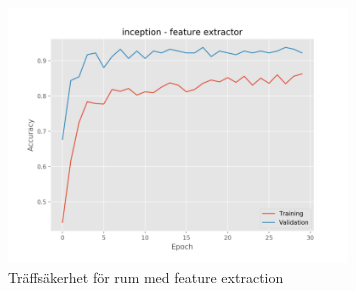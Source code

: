\documentclass[]{kththesis}
\begin{document}
\begin{figure}[h]
    \includegraphics[width=9cm]{r_a_inception_fe}
    \caption{Träffsäkerhet för rum med feature extraction}
    \label{fig:r_a_1}
  \end{figure}
  
\end{document}
